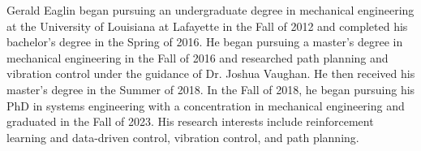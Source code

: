 
\begin{biosketch} %
%
Gerald Eaglin began pursuing an undergraduate degree in mechanical engineering at the University of Louisiana at Lafayette in the Fall of 2012 and completed his bachelor's degree in the Spring of 2016. He began pursuing a master's degree in mechanical engineering in the Fall of 2016 and researched path planning and vibration control under the guidance of Dr. Joshua Vaughan. He then received his master's degree in the Summer of 2018. In the Fall of 2018, he began pursuing his PhD in systems engineering with a concentration in mechanical engineering and graduated in the Fall of 2023. His research interests include reinforcement learning and data-driven control, vibration control, and path planning.
%
\end{biosketch}